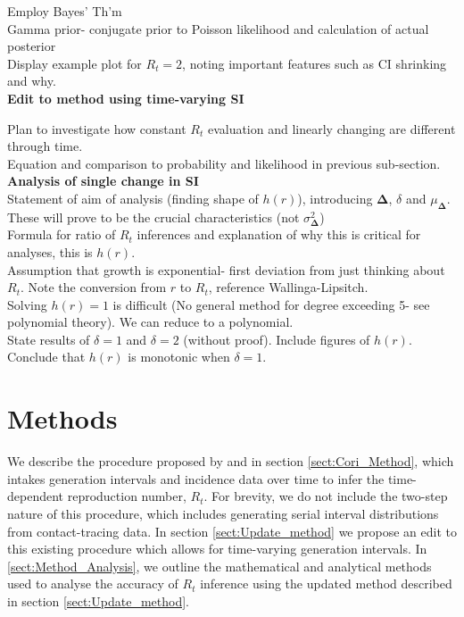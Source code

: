 \documentclass[10pt,journal,compsoc]{IEEEtran}
\begin{document}
Employ Bayes' Th'm\\

Gamma prior- conjugate prior to Poisson likelihood and calculation of actual posterior\\

Display example plot for $R_t=2$, noting important features such as  CI shrinking and why.\\

\textbf{Edit to method using time-varying SI}

Plan to investigate how constant $R_t$ evaluation and linearly changing are different through time.\\

Equation and comparison to probability and likelihood in previous sub-section.\\

\textbf{Analysis of single change in SI}\\

Statement of aim of analysis (finding shape of $h(r)$), introducing $\boldsymbol{\Delta}$, $\delta$ and $\mu_{\boldsymbol{\Delta}}$. These will prove to be the crucial characteristics (not $\sigma^2_{\boldsymbol{\Delta}}$)\\

Formula for ratio of $R_t$ inferences and explanation of why this is critical for analyses, this is $h(r)$.\\

Assumption that growth is exponential- first deviation from just thinking about $R_t$. Note the conversion from $r$ to $R_t$, reference Wallinga-Lipsitch.\\

Solving $h(r)=1$ is difficult (No general method for degree exceeding 5- see polynomial theory). We can reduce to a polynomial.\\

State results of $\delta=1$ and $\delta=2$ (without proof). Include figures of $h(r)$. Conclude that $h(r)$ is monotonic when $\delta=1$.\\

\section{Methods}\label{sect:Methods}

We describe the procedure proposed by \cite{Cori-Ferguson} and \cite{Thompson-Stockwin} in section \ref{sect:Cori_Method}, which intakes generation intervals and incidence data over time to infer the time-dependent reproduction number, $R_t$. For brevity, we do not include the two-step nature of this procedure, which includes generating serial interval distributions from contact-tracing data. In section \ref{sect:Update_method} we propose an edit to this existing procedure which allows for time-varying generation intervals. In \ref{sect:Method_Analysis}, we outline the mathematical and analytical methods used to analyse the accuracy of $R_t$ inference using the updated method described in section \ref{sect:Update_method}. \\
\end{document}
